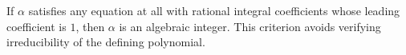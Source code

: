 If $\alpha$ satisfies any equation at all with rational integral coefficients whose leading coefficient is $1$, then $\alpha$ is an algebraic integer. This criterion avoids verifying irreducibility of the defining polynomial.
